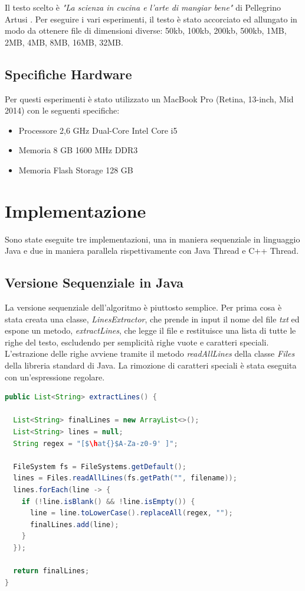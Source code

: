 \documentclass[10pt,twocolumn,letterpaper]{article}
\begin{document}
Il testo scelto è \textit{"La scienza in cucina e l'arte di mangiar bene"} di Pellegrino Artusi \cite{ARTUSI}. Per eseguire i vari esperimenti, il testo è stato accorciato ed allungato in modo da ottenere file di dimensioni diverse: 50kb, 100kb, 200kb, 500kb, 1MB, 2MB, 4MB, 8MB, 16MB, 32MB.

\subsection{Specifiche Hardware}
Per questi esperimenti è stato utilizzato un MacBook Pro (Retina, 13-inch, Mid 2014) con le seguenti specifiche:
\begin{itemize}
	\item Processore 2,6 GHz Dual-Core Intel Core i5
	\item Memoria 8 GB 1600 MHz DDR3
	\item Memoria Flash Storage 128 GB
\end{itemize}

\section{Implementazione}
Sono state eseguite tre implementazioni, una in maniera sequenziale in linguaggio Java e due in maniera parallela rispettivamente con Java Thread e C++ Thread.

\subsection{Versione Sequenziale in Java}
La versione sequenziale dell'algoritmo è piuttosto semplice. Per prima cosa è stata creata una classe, \textit{LinesExtractor}, che prende in input il nome del file \textit{txt} ed espone un metodo, \textit{extractLines}, che legge il file e restituisce una lista di tutte le righe del testo, escludendo per semplicità righe vuote e caratteri speciali. L'estrazione delle righe avviene tramite il metodo \textit{readAllLines} della classe \textit{Files} della libreria standard di Java. La rimozione di caratteri speciali è stata eseguita con un'espressione regolare.\newline

\begin{lstlisting}[basicstyle=\scriptsize, language=Java, frame=single, caption={Esempio di estrazione di righe da un file in Java},captionpos=b, showstringspaces=false, mathescape=true]
public List<String> extractLines() {
  
  List<String> finalLines = new ArrayList<>();
  List<String> lines = null;
  String regex = "[$\hat{}$A-Za-z0-9' ]";

  FileSystem fs = FileSystems.getDefault();
  lines = Files.readAllLines(fs.getPath("", filename));
  lines.forEach(line -> {
    if (!line.isBlank() && !line.isEmpty()) {
      line = line.toLowerCase().replaceAll(regex, "");
      finalLines.add(line);
    }
  });
  
  return finalLines;
}  
\end{lstlisting}
\end{document}
